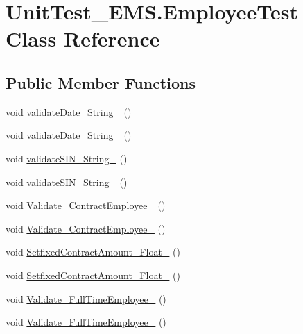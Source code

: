 \hypertarget{class_unit_test___e_m_s_1_1_employee_test}{\section{Unit\-Test\-\_\-\-E\-M\-S.\-Employee\-Test Class Reference}
\label{class_unit_test___e_m_s_1_1_employee_test}
}
\subsection*{Public Member Functions}
\begin{DoxyCompactItemize}
\item 
void \hyperlink{class_unit_test___e_m_s_1_1_employee_test_a10a7b138cbb8baeecd58186aff84a6f5}{validate\-Date\-\_\-\-String\-\_} ()
\item 
void \hyperlink{class_unit_test___e_m_s_1_1_employee_test_ada3cafa9a4f068f117f707697da189e5}{validate\-Date\-\_\-\-String\-\_} ()
\item 
void \hyperlink{class_unit_test___e_m_s_1_1_employee_test_a36a25acfc1b3ad541144c8402406a644}{validate\-S\-I\-N\-\_\-\-String\-\_} ()
\item 
void \hyperlink{class_unit_test___e_m_s_1_1_employee_test_ae2dda73c061be87f4ceda044188c3ffb}{validate\-S\-I\-N\-\_\-\-String\-\_} ()
\item 
void \hyperlink{class_unit_test___e_m_s_1_1_employee_test_a278fd357ee18188e4a452eb111984222}{Validate\-\_\-\-Contract\-Employee\-\_} ()
\item 
void \hyperlink{class_unit_test___e_m_s_1_1_employee_test_af30c086d80689387176e4f3ecf92d653}{Validate\-\_\-\-Contract\-Employee\-\_} ()
\item 
void \hyperlink{class_unit_test___e_m_s_1_1_employee_test_a66e975cf4392680cb1daa8e18496544e}{Setfixed\-Contract\-Amount\-\_\-\-Float\-\_} ()
\item 
void \hyperlink{class_unit_test___e_m_s_1_1_employee_test_ae23a919a63e695a12b77a5a0c79f2353}{Setfixed\-Contract\-Amount\-\_\-\-Float\-\_} ()
\item 
void \hyperlink{class_unit_test___e_m_s_1_1_employee_test_a5c98140f8985057f9dca16f45e259406}{Validate\-\_\-\-Full\-Time\-Employee\-\_} ()
\item 
void \hyperlink{class_unit_test___e_m_s_1_1_employee_test_ae870873cc69c121338b360ceb34163b9}{Validate\-\_\-\-Full\-Time\-Employee\-\_} ()
\item 

\end{DoxyCompactItemize}
